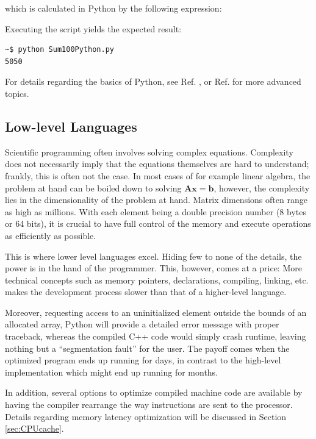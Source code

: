which is calculated in Python by the following expression:



Executing the script yields the expected result:

\begin{verbatim}
~$ python Sum100Python.py 
5050
\end{verbatim}

For details regarding the basics of Python, see Ref. \cite{inf1100}, or Ref. \cite{inf3331} for more advanced topics.  


\subsection{Low-level Languages}
\label{sec:lowlevel}

Scientific programming often involves solving complex equations. Complexity does not necessarily imply that the equations themselves are hard to understand; frankly, this is often not the case. In most cases of for example linear algebra, the problem at hand can be boiled down to solving $\mathbf{A}\mathbf{x} = \mathbf{b}$, however, the complexity lies in the dimensionality of the problem at hand. Matrix dimensions often range as high as millions. With each element being a double precision number (8 bytes or 64 bits), it is crucial to have full control of the memory and execute operations as efficiently as possible. 

This is where lower level languages excel. Hiding few to none of the details, the power is in the hand of the programmer. This, however, comes at a price: More technical concepts such as memory pointers, declarations, compiling, linking, etc. makes the development process slower than that of a higher-level language. 

Moreover, requesting access to an uninitialized element outside the bounds of an allocated array, Python will provide a detailed error message with proper traceback, whereas the compiled C++ code would simply crash runtime, leaving nothing but a ``segmentation fault'' for the user. The payoff comes when the optimized program ends up running for days, in contrast to the high-level implementation which might end up running for months.

In addition, several options to optimize compiled machine code are available by having the compiler rearrange the way instructions are sent to the processor. Details regarding memory latency optimization will be discussed in Section \ref{sec:CPUcache}. 

